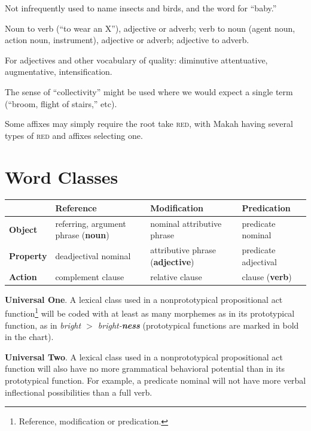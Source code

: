 \documentclass[11pt]{article}
\newcommand{\LL}[1]{\textbf{#1}}  %
\newcommand{\I}[1]{\textsc{#1}}   %
\begin{document}
Not infrequently used to name insects and birds, and the word for
``baby.'' 

Noun to verb (``to wear an X''), adjective or adverb; verb to noun
(agent noun, action noun, instrument), adjective or adverb; adjective
to adverb.

For adjectives and other vocabulary of quality: diminutive
attentuative, augmentative, intensification.

The sense of ``collectivity'' might be used where we would expect a
single term (``broom, flight of stairs,'' etc).

Some affixes may simply require the root take \I{red}, with Makah
having several types of \I{red} and affixes selecting one.


\section{Word Classes}

\begin{center}
  \small
  \begin{tabular}{|l|l|l|l|}
    \hline
    & \LL{Reference} & \LL{Modification} & \LL{Predication} \\
    \hline
\LL{Object} & referring, argument phrase (\LL{noun}) & nominal attributive phrase &
                                                                   predicate
                                                                   nominal \\
    \hline
\LL{Property} & deadjectival nominal & attributive phrase (\LL{adjective}) & predicate adjectival\\
    \hline
\LL{Action} & complement clause & relative clause & clause (\LL{verb})\\
    \hline
  \end{tabular}
\end{center}


\LL{Universal One}. A lexical class used in a nonprototypical
propositional act function\footnote{Reference, modification or
predication.} will be coded with at least as many morphemes as in
its prototypical function, as in \textit{bright $>$ bright-\LL{ness}}
(prototypical functions are marked in bold in the chart).

\LL{Universal Two}. A lexical class used in a nonprototypical
propositional act function will also have no more grammatical
behavioral potential than in its prototypical function. For example, a
predicate nominal will not have more verbal inflectional possibilities
than a full verb.
\end{document}

